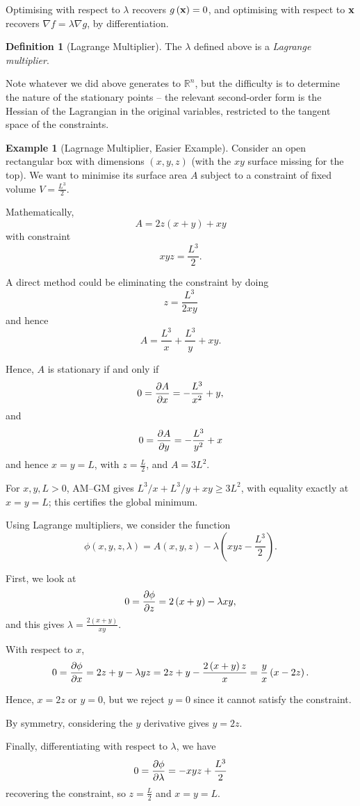 \documentclass[11pt]{article}
\numberwithin{equation}{section}
\theoremstyle{definition}
\newtheorem{definition}[theorem]{Definition}
\newtheorem{example}[theorem]{Example}
\theoremstyle{remark}
\newcommand{\pqty}[1]{\left(#1\right)}
\newcommand{\flatfrac}[2]{\frac{#1}{#2}}
\newcommand{\RR}{\mathbb{R}}
\newcommand{\grad}{\nabla}
\begin{document}
Optimising with respect to \(\lambda\) recovers \(g\pqty{\vb{x}} = 0\), and optimising with respect to \(\vb{x}\) recovers \(\grad f = \lambda \grad g\), by differentiation.

\begin{definition}[Lagrange Multiplier]\label{variation-unit-0036}
    \label{def:lagrange-multiplier}%
    The \(\lambda\) defined above is a \emph{Lagrange multiplier}.
\end{definition}

Note whatever we did above generates to \(\RR^n\), but the difficulty is to determine the nature of the stationary points -- the relevant second-order form is the Hessian of the Lagrangian in the original variables, restricted to the tangent space of the constraints.

\begin{example}[Lagrnage Multiplier, Easier Example]\label{variation-unit-0037}
    Consider an open rectangular box with dimensions \(\pqty{x, y, z}\) (with the \(xy\) surface missing for the top). We want to minimise its surface area \(A\) subject to a constraint of fixed volume \(V = \flatfrac{L^3}{2}\).
        
    Mathematically,
    \[
        A = 2z \pqty{x + y} + xy
    \]
    with constraint
    \[
        xyz = \frac{L^3}{2}.
    \]

    A direct method could be eliminating the constraint by doing
    \[
        z = \frac{L^3}{2xy}
    \]
    and hence
    \[
        A = \frac{L^3}{x} + \frac{L^3}{y} + xy.
    \]

    Hence, \(A\) is stationary if and only if
    \[
        0 = \pdv{A}{x} = - \frac{L^3}{x^2} + y,
    \]
    and
    \[
        0 = \pdv{A}{y} = - \frac{L^3}{y^2} + x
    \]
    and hence \(x = y = L\), with \(z = \flatfrac{L}{2}\), and \(A = 3 L^2\).

    For \(x,y,L>0\), AM--GM gives \(L^3/x+L^3/y+xy\ge3L^2\), with equality exactly at \(x=y=L\); this certifies the global minimum.

    Using Lagrange multipliers, we consider the function
    \[
        \phi\pqty{x, y, z, \lambda} = A\pqty{x, y, z} - \lambda \pqty{xyz - \frac{L^3}{2}}.
    \]

    First, we look at
    \[
        0 = \pdv{\phi}{z} = 2\pqty{x + y} - \lambda xy,
    \]
    and this gives \(\lambda = \flatfrac{2 \pqty{x + y}}{xy}\).

    With respect to \(x\),
    \[
        0 = \pdv{\phi}{x} = 2z + y - \lambda yz = 2z + y - \frac{2 \pqty{x + y} z}{x} = \frac{y}{x} \pqty{x - 2z}.
    \]
    
    Hence, \(x = 2z\) or \(y = 0\), but we reject \(y = 0\) since it cannot satisfy the constraint.

    By symmetry, considering the \(y\) derivative gives \(y = 2z\).

    Finally, differentiating with respect to \(\lambda\), we have
    \[
        0 = \pdv{\phi}{\lambda} = -xyz + \frac{L^3}{2}
    \]
    recovering the constraint, so \(z = \flatfrac{L}{2}\) and \(x = y = L\).
\end{example}
\end{document}
